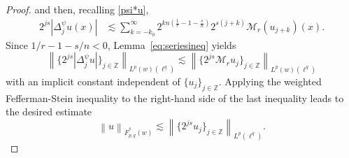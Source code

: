 \documentclass[10pt,a4paper]{article}
\theoremstyle{remark}
\newcommand{\ent}{\mathbb{Z}}
\newcommand{\tlw}[4]{\dot F_{#1,#3}^{#2}(#4)} %
\newcommand{\M}{\mathcal{M}} %
\newcommand{\norm}[2]{\left\|#1\right\|_{#2}}
\begin{document}
\begin{proof}
and then, recalling \eqref{psi*u}, 
\begin{align*}
2^{js} |\Delta^\psi_j  u(x)| & \lesssim  \sum_{k =  - k_0}^\infty 2^{k n (\frac{1}{r} -1-\frac{s}{n})} 2^{s(j+k)}\M_r(u_{j+k})(x).
\end{align*}
Since $1/r -1-s/n < 0$,   Lemma~\ref{eq:seriesineq}  yields
$$
\norm{\{ 2^{js} |\Delta^\psi_j  u|\}_{j\in\ent}}{L^p(w)(\ell^{q})} \lesssim \norm{\{2^{js} \M_ru_j\}_{j\in\ent}}{L^p(w)(\ell^{q})}
$$
with an implicit constant independent of $\{u_j\}_{j\in \ent}.$
Applying the weighted  Fefferman-Stein inequality  to the right-hand side of the last inequality leads to the desired estimate
\begin{equation*}
\norm{u}{\tlw{p}{s}{q}{w}} \lesssim \norm{\{2^{js}u_j\}_{j\in\ent}}{L^p(\ell^{q})}.
\end{equation*}


\end{proof}
\end{document}
